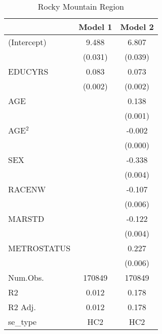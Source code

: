 \documentclass[12pt, English]{article}
\begin{document}
\newpage




\begin{table}
\centering %
    \caption{Rocky Mountain Region}
    \vspace{7.5mm} %
\begin{tabular}[t]{lcc}
\toprule
  & Model 1 & Model 2\\
\midrule
(Intercept) & 9.488 & 6.807\\
 & (0.031) & (0.039)\\
EDUCYRS & 0.083 & 0.073\\
 & (0.002) & (0.002)\\
AGE &  & 0.138\\
 &  & (0.001)\\
AGE$^2$ &  & -0.002\\
 &  & (0.000)\\
SEX &  & -0.338\\
 &  & \vphantom{1} (0.004)\\
RACENW &  & -0.107\\
 &  & \vphantom{1} (0.006)\\
MARSTD &  & -0.122\\
 &  & (0.004)\\
METROSTATUS &  & 0.227\\
 &  & (0.006)\\
\midrule
Num.Obs. & 170849 & 170849\\
R2 & 0.012 & 0.178\\
R2 Adj. & 0.012 & 0.178\\
se\_type & HC2 & HC2\\
\bottomrule
\end{tabular}
\end{table}

\newpage
\end{document}
